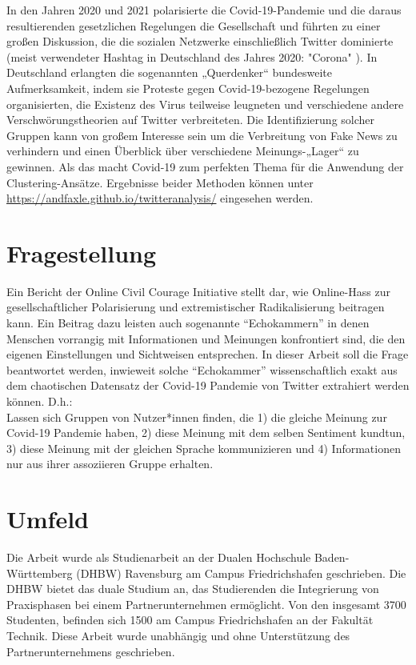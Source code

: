 In den Jahren 2020 und 2021 polarisierte die Covid-19-Pandemie und die daraus resultierenden gesetzlichen Regelungen die Gesellschaft und führten zu einer großen Diskussion, die die sozialen Netzwerke einschließlich Twitter dominierte (meist verwendeter Hashtag in Deutschland des Jahres 2020: "Corona"  \cite{top-hashtags-de}).
In Deutschland erlangten die sogenannten „Querdenker“ bundesweite Aufmerksamkeit, indem sie Proteste gegen Covid-19-bezogene Regelungen organisierten, die Existenz des Virus teilweise leugneten und verschiedene andere Verschwörungstheorien auf Twitter verbreiteten.
Die Identifizierung solcher Gruppen kann von großem Interesse sein um die Verbreitung von Fake News zu verhindern und einen Überblick über verschiedene Meinungs-„Lager“ zu gewinnen. Als das macht Covid-19 zum perfekten Thema für die Anwendung der Clustering-Ansätze.
Ergebnisse beider Methoden können unter \url{https://andfaxle.github.io/twitteranalysis/} eingesehen werden.
\section{Fragestellung}
\label{sec:fragestellung}
Ein Bericht der Online Civil Courage Initiative stellt dar, wie Online-Hass zur gesellschaftlicher Polarisierung und extremistischer Radikalisierung beitragen kann.
Ein Beitrag dazu leisten auch sogenannte "`Echokammern"' in denen Menschen vorrangig mit Informationen und Meinungen konfrontiert sind, die den eigenen Einstellungen und Sichtweisen entsprechen. \cite{hassrede} In dieser Arbeit soll die Frage beantwortet werden, inwieweit solche "`Echokammer"' wissenschaftlich exakt aus dem chaotischen Datensatz der Covid-19 Pandemie von Twitter extrahiert werden können. D.h.:\\
Lassen sich Gruppen von Nutzer*innen finden, die 1) die gleiche Meinung zur Covid-19 Pandemie haben, 2) diese Meinung mit dem selben Sentiment kundtun, 3) diese Meinung mit der gleichen Sprache kommunizieren und 4) Informationen nur aus ihrer assoziieren Gruppe erhalten.
\section{Umfeld}
\label{sec:umfeld}
Die Arbeit wurde als Studienarbeit an der Dualen Hochschule Baden-Württemberg (DHBW) Ravensburg am Campus Friedrichshafen geschrieben. Die DHBW bietet das duale Studium an, das Studierenden die Integrierung von Praxisphasen bei einem Partnerunternehmen ermöglicht. Von den insgesamt 3700 Studenten, befinden sich 1500 am Campus Friedrichshafen an der Fakultät Technik.
Diese Arbeit wurde unabhängig und ohne Unterstützung des Partnerunternehmens geschrieben.
